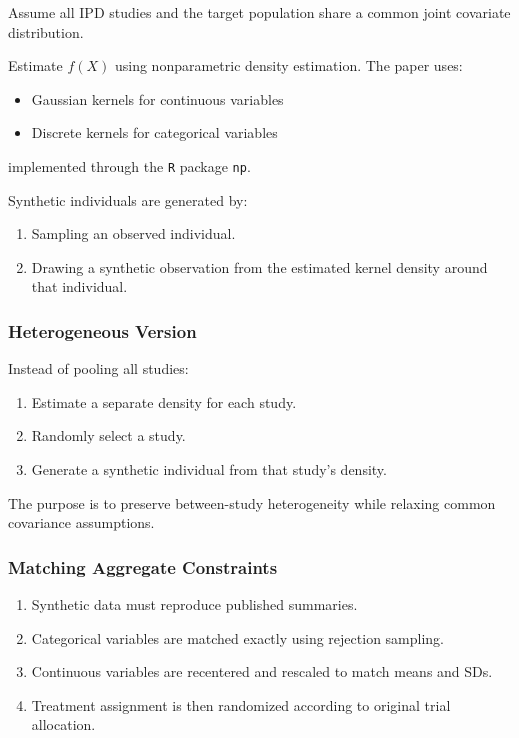 \documentclass[11pt]{article}
\begin{document}
Assume all IPD studies and the target population share a common joint covariate distribution.

Estimate $f(X)$ using nonparametric density estimation. The paper uses:
\begin{itemize}
    \item Gaussian kernels for continuous variables
    \item Discrete kernels for categorical variables
\end{itemize}
implemented through the \texttt{R} package \texttt{np}.

Synthetic individuals are generated by:
\begin{enumerate}
    \item Sampling an observed individual.
    \item Drawing a synthetic observation from the estimated kernel density around that individual.
\end{enumerate}

\subsubsection*{Heterogeneous Version}

Instead of pooling all studies:
\begin{enumerate}
    \item Estimate a separate density for each study.
    \item Randomly select a study.
    \item Generate a synthetic individual from that study's density.
\end{enumerate}
The purpose is to preserve between-study heterogeneity while relaxing common covariance assumptions.

\subsubsection*{Matching Aggregate Constraints}
\begin{enumerate}
    \item Synthetic data must reproduce published summaries.
    \item Categorical variables are matched exactly using rejection sampling.
    \item Continuous variables are recentered and rescaled to match means and SDs.
    \item Treatment assignment is then randomized according to original trial allocation.
\end{enumerate}
\end{document}
